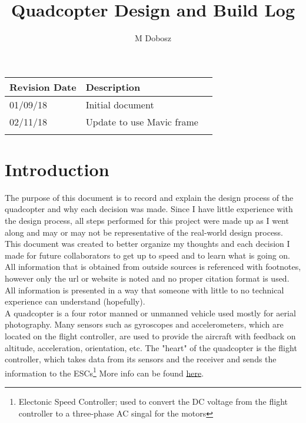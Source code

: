 \documentclass[12pt]{article}
\title{Quadcopter Design and Build Log}
\author{M Dobosz}
\begin{document}
\begin{titlepage}
\vspace*{-4.5cm}
\hspace*{-4.1cm}
{\let\newpage\relax\maketitle}

\begin{table}[b]
\begin{center}
\begin{tabular}{| l | l | l |}
\hline
\textbf{Revision Date} & \textbf{Description} \\ \hline
01/09/18 & Initial document \\ \hline
02/11/18 & Update to use Mavic frame \\ \hline
& \\ \hline

\end{tabular}
\end{center}
\end{table}
\end{titlepage}


\pagebreak
\tableofcontents
\pagebreak

\section{Introduction}

The purpose of this document is to record and explain the design process of the quadcopter and why each decision was made. Since I have little experience with the design process, all steps performed for this project were made up as I went along and may or may not be representative of the real-world design process. This document was created to better organize my thoughts and each decision I made for future collaborators to get up to speed and to learn what is going on. All information that is obtained from outside sources is referenced with footnotes, however only the url or website is noted and no proper citation format is used. All information is presented in a way that someone with little to no technical experience can understand (hopefully).
\\

A quadcopter is a four rotor manned or unmanned vehicle used mostly for aerial photography. Many sensors such as gyroscopes and accelerometers, which are located on the flight controller, are used to provide the aircraft with feedback on altitude, acceleration, orientation, etc. The "heart" of the quadcopter is the flight controller, which takes data from its sensors and the receiver and sends the information to the ESCs\footnote{Electonic Speed Controller; used to convert the DC voltage from the flight controller to a three-phase AC singal for the motors} More info can be found \href{https://en.wikipedia.org/wiki/Quadcopter}{\color{cyan}here}.
\\
\end{document}
